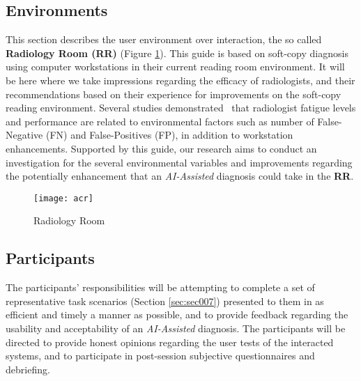 \subsection{Environments}

This section describes the user environment over interaction, the so called \textbf{Radiology Room (RR)} (Figure \ref{fig:radioroom}). This guide is based on soft-copy diagnosis using computer workstations in their current reading room environment. It will be here where we take impressions regarding the efficacy of radiologists, and their recommendations based on their experience for improvements on the soft-copy reading environment. Several studies demonstrated~\cite{waite2017tired} that radiologist fatigue levels and performance are related to environmental factors such as number of False-Negative (FN) and False-Positives (FP), in addition to workstation enhancements. Supported by this guide, our research aims to conduct an investigation for the several environmental variables and improvements regarding the potentially enhancement that an \textit{AI-Assisted} diagnosis could take in the \textbf{RR}.


\begin{figure}[h]
\centering
\texttt{[image: acr]}
\caption{Radiology Room}
\label{fig:radioroom}
\end{figure}



\subsection{Participants}

The participants' responsibilities will be attempting to complete a set of representative task scenarios (Section \ref{sec:sec007}) presented to them in as efficient and timely a manner as possible, and to provide feedback regarding the usability and acceptability of an \textit{AI-Assisted} diagnosis. The participants will be directed to provide honest opinions regarding the user tests of the interacted systems, and to participate in post-session subjective questionnaires and debriefing.

